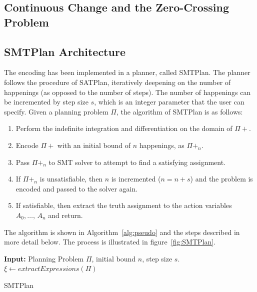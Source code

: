 \subsection{Continuous Change and the Zero-Crossing Problem}\label{sec:enc_zerocrossing}



\subsection{SMTPlan Architecture} \label{sssec:SMTPlan_Archi}

The encoding has been implemented in a planner, called SMTPlan. The planner follows the procedure of SATPlan, iteratively deepening on the number of happenings (as opposed to the number of steps). The number of happenings can be incremented by step size $s$, which is an integer parameter that the user can specify. Given a planning problem $\Pi$, the algorithm of SMTPlan is as follows:

\begin{enumerate}
\item
Perform the indefinite integration and differentiation on the domain of $\Pi+$.
\item
Encode $\Pi+$ with an initial bound of $n$ happenings, as $\Pi+_n$.
\item
Pass $\Pi+_n$ to SMT solver to attempt to find a satisfying assignment.
\item
If $\Pi+_n$ is unsatisfiable, then $n$ is incremented ($n=n+s$) and the problem is encoded and passed to the solver again.
\item
If satisfiable, then extract the truth assignment to the action variables $A_0, \ldots,\, A_n$ and return.
\end{enumerate}
The algorithm is shown in Algorithm~\ref{alg:pseudo} and the steps described in more detail below. The process is illustrated in figure~\ref{fig:SMTPlan}.

\begin{algorithm}
\SetAlgoLined
\textbf{Input:} Planning Problem $\Pi$, initial bound $n$, step size $s$.\\
$\xi \leftarrow extractExpressions(\Pi)$
\caption{SMTPlan}
\label{alg:pseudo}
\end{algorithm}

